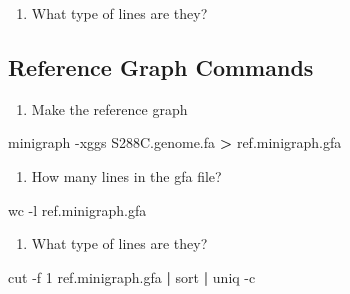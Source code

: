\documentclass[
]{book}
\newenvironment{Shaded}{\begin{snugshade}}{\end{snugshade}}
\newcommand{\AttributeTok}[1]{\textcolor[rgb]{0.77,0.63,0.00}{#1}}
\newcommand{\ExtensionTok}[1]{#1}
\newcommand{\FunctionTok}[1]{\textcolor[rgb]{0.00,0.00,0.00}{#1}}
\newcommand{\KeywordTok}[1]{\textcolor[rgb]{0.13,0.29,0.53}{\textbf{#1}}}
\newcommand{\NormalTok}[1]{#1}
\newcommand{\OperatorTok}[1]{\textcolor[rgb]{0.81,0.36,0.00}{\textbf{#1}}}
\providecommand{\tightlist}{%
  \setlength{\itemsep}{0pt}\setlength{\parskip}{0pt}}
\begin{document}
\begin{enumerate}
\def\labelenumi{\arabic{enumi}.}
\setcounter{enumi}{2}
\tightlist
\item
  What type of lines are they?
\end{enumerate}

\begin{Shaded}
\begin{Highlighting}[]

\end{Highlighting}
\end{Shaded}

\hypertarget{reference-graph-commands}{%
\subsection*{Reference Graph Commands}\label{reference-graph-commands}}

\begin{enumerate}
\def\labelenumi{\arabic{enumi}.}
\tightlist
\item
  Make the reference graph
\end{enumerate}

\begin{Shaded}
\begin{Highlighting}[]
\ExtensionTok{minigraph} \AttributeTok{{-}xggs}\NormalTok{ S288C.genome.fa }\OperatorTok{\textgreater{}}\NormalTok{ ref.minigraph.gfa}
\end{Highlighting}
\end{Shaded}

\begin{enumerate}
\def\labelenumi{\arabic{enumi}.}
\setcounter{enumi}{1}
\tightlist
\item
  How many lines in the gfa file?
\end{enumerate}

\begin{Shaded}
\begin{Highlighting}[]
\FunctionTok{wc} \AttributeTok{{-}l}\NormalTok{ ref.minigraph.gfa}
\end{Highlighting}
\end{Shaded}

\begin{enumerate}
\def\labelenumi{\arabic{enumi}.}
\setcounter{enumi}{2}
\tightlist
\item
  What type of lines are they?
\end{enumerate}

\begin{Shaded}
\begin{Highlighting}[]
\FunctionTok{cut} \AttributeTok{{-}f}\NormalTok{ 1 ref.minigraph.gfa }\KeywordTok{|} \FunctionTok{sort} \KeywordTok{|} \FunctionTok{uniq} \AttributeTok{{-}c}
\end{Highlighting}
\end{Shaded}
\end{document}
